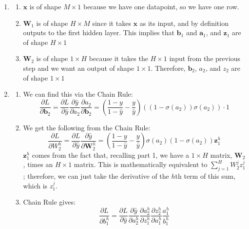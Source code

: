 \documentclass[submit]{harvardml}
\newenvironment{ans}{
  \begin{enumerate}
  \color{blue}
}{
  \end{enumerate}
  \color{black}
}
\begin{document}
\begin{ans}
    \item 
    \begin{enumerate}
        \item $\mathbf x$ is of shape $M \times 1$ because we have one datapoint, so we have one row. 
        \item $\mathbf W_1$ is of shape $H \times M$ since it takes $\mathbf x$ as its input, and by definition outputs to the first hidden layer. This implies that $\mathbf b_1$ and $\mathbf a_1$, and $\mathbf z_1$ are of shape $H \times 1$
        \item $\mathbf W_2$ is of shape $1 \times H$ because it takes the $H \times 1$ input from the previous step and we want an output of shape $1 \times 1$. 
        Therefore, $\mathbf b_2$, $a_2$, and $z_2$ are of shape $1 \times 1$
    \end{enumerate}
    \item 
    \begin{enumerate}
        \item We can find this via the Chain Rule:
        $$
        \frac{\partial L}{\partial \mathbf b_2} = \frac{\partial L}{\partial \hat y}\frac{\partial \hat y}{\partial a_2} \frac{\partial a_2}{\partial \mathbf b_2} = \left(\frac{1 - y}{1 - \hat y}-\frac{y}{\hat y}\right) \left((1 - \sigma(a_2)) \sigma(a_2)\right) \cdot 1
        $$
        \item We get the following from the Chain Rule:
        $$
        \frac{\partial L}{\partial W_2^h} = \frac{\partial L}{\partial \hat y}\frac{\partial \hat y}{\partial \mathbf W_2^h}=\left(\frac{1 - y}{1 - \hat y}-\frac{y}{\hat y}\right) \sigma(a_2)(1 - \sigma(a_2))\mathbf z_1^h
        $$
        $ \mathbf z_1^h$ comes from the fact that, recalling part 1, we have a $1 \times H$ matrix, $\mathbf W_2$, times an $H \times 1$ matrix. This is mathematically equivalent to $\sum_{j = 1}^H W_2^j z_1^j$; therefore, we can just take the derivative of the $h$th term of this sum, which is $z_1^j$. 
        \item Chain Rule gives:
        $$
        \frac{\partial L}{\partial b_1^h} = \frac{\partial L}{\partial \hat y} \frac{\partial \hat y}{\partial a_2^h} \frac{\partial a_2^h}{\partial z_1^h}\frac{\partial z_2^h}{\partial a_1^h}\frac{a_1^h}{b_1^h}
$$
\end{enumerate}
\end{ans}
\end{document}
